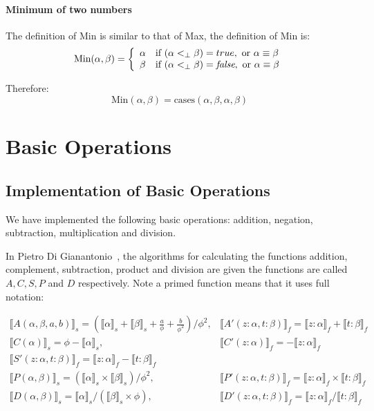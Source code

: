 \documentclass{cs4rep}
\begin{document}
\subsubsection*{Minimum of two numbers}
The definition of Min is similar to that of Max, the definition of Min is:
\[ \mbox{Min}(\alpha,\beta) = \left\{ 
\begin{array}{ll}
\alpha & \mbox{if } (\alpha <_{\perp} \beta) = true, \mbox{ or } \alpha \equiv \beta \\
\beta & \mbox{if } (\alpha <_{\perp} \beta)  =  \mbox{{\em false}}, \mbox{ or } \alpha \equiv \beta
\end{array}
\right. \]

Therefore:
\[ \mbox{Min}(\alpha,\beta) = \mbox{cases}(\alpha,\beta,\alpha,\beta) \]

\chapter{Basic Operations} \label{ch:bo}
\section{Implementation of Basic Operations}
We have implemented the following basic operations: addition,
negation, subtraction, multiplication and division.

In Pietro Di Gianantonio~\cite{kn:DiGianantonio}, the algorithms for
calculating the functions addition, complement, subtraction, product
and division are given the functions are called $A, C, S, P$ and $D$
respectively. Note a primed function means that it uses full notation:

\( \begin{array}{ll}
  \llbracket A(\alpha,\beta,a,b) \rrbracket_{s} = (\llbracket \alpha \rrbracket_{s} + \llbracket \beta \rrbracket_{s} + \frac{a}{\phi} + \frac{b}{\phi^{2}})/ \phi^{2}, & \llbracket A'(z:\alpha,t:\beta) \rrbracket_{f} = \llbracket z:\alpha \rrbracket_{f} + \llbracket t:\beta \rrbracket_{f} \\
  \llbracket C(\alpha) \rrbracket_{s} = \phi - \llbracket \alpha \rrbracket_{s}, & \llbracket C'(z:\alpha) \rrbracket_{f} = - \llbracket z:\alpha \rrbracket_{f} \\
  \llbracket S'(z:\alpha,t:\beta) \rrbracket_{f} = \llbracket z:\alpha \rrbracket_{f} - \llbracket t:\beta \rrbracket_{f} \\
  \llbracket P(\alpha,\beta) \rrbracket_{s} = (\llbracket \alpha \rrbracket_{s} \times \llbracket \beta \rrbracket_{s})/ \phi^{2}, & \llbracket P'(z:\alpha, t:\beta) \rrbracket_{f} = \llbracket z:\alpha \rrbracket_{f} \times \llbracket t:\beta \rrbracket_{f} \\
  \llbracket D(\alpha,\beta)\rrbracket_{s}= \llbracket
  \alpha\rrbracket_{s}/(\llbracket \beta \rrbracket_{s} \times \phi),
  & \llbracket D'(z:\alpha,t:\beta)\rrbracket_{f}= \llbracket z:\alpha
  \rrbracket_{f}/\llbracket t:\beta \rrbracket_{f}
\end{array} \)
\end{document}
